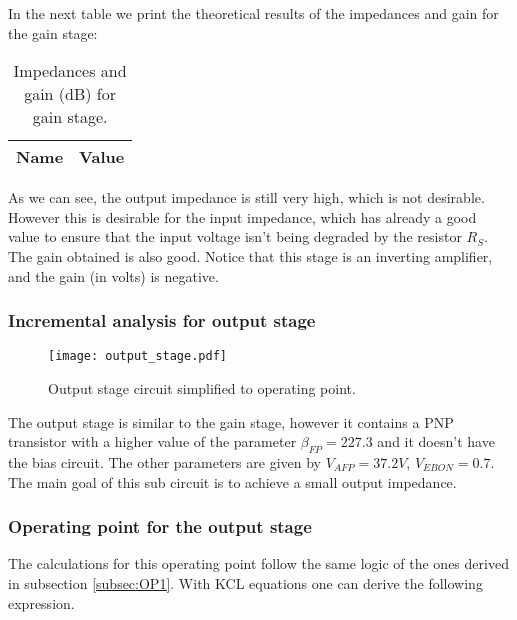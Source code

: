 \par In the next table we print the theoretical results of the impedances and gain for the gain stage:

 \begin{table}[H]
    \centering
    \begin{tabular}{|l|r|}
    \hline    
    {\bf Name} & {\bf Value} \\ \hline
    
    \end{tabular}
     \caption{Impedances and gain (dB) for gain stage.}
    \label{tab:inc1}
  \end{table}
 
 \par As we can see, the output impedance is still very high, which is not desirable. However this is desirable for the input impedance, which has already a good value to ensure that the input voltage isn't being degraded by the resistor $R_S$. The gain obtained is also good. Notice that this stage is an inverting amplifier, and the gain (in volts) is negative.
 
\subsubsection{Incremental analysis for output stage}
\label{subsec:op2}

 \begin{figure}[H] \centering
\texttt{[image: output\_stage.pdf]}
\caption{Output stage circuit simplified to operating point.}
\label{fig:output_stage}
\end{figure}
 
 
 \par The output stage is similar to the gain stage, however it contains a PNP transistor with a higher value of the parameter $\beta _{FP}=227.3$ and it doesn't have the bias circuit. The other parameters are given by $V_{AFP}=37.2V$, $V_{EBON}=0.7$. The main goal of this sub circuit is to achieve a small output impedance.
 
\subsubsection{Operating point for the output stage}

\par The calculations for this operating point follow the same logic of the ones derived in subsection \ref{subsec:OP1}. With KCL equations one can derive the following expression.

